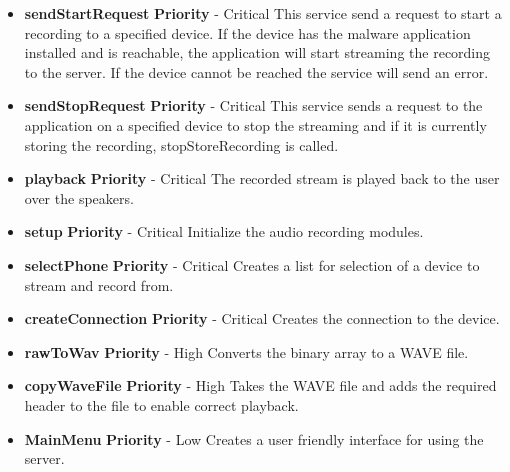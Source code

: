 \documentclass[a4paper,12pt,titlepage]{article}
\begin{document}
		\begin{itemize}
			\item \textbf{sendStartRequest}
				\newline\textbf{ Priority } - Critical
				\newline This service send a request to start a recording to a specified device. If the device has the malware application installed and is reachable, the application will start streaming the recording to the server. If the device cannot be reached the service will send an error.
			\item \textbf{sendStopRequest}
				\newline\textbf{ Priority } - Critical
				\newline This service sends a request to the application on a specified device to stop the streaming and if it is currently storing the recording, stopStoreRecording is called.
			\item \textbf{playback}
				\newline\textbf{ Priority } - Critical
				\newline The recorded stream is played back to the user over the speakers.
			\item \textbf{setup}
				\newline\textbf{ Priority } - Critical
				\newline Initialize the audio recording modules.
			\item \textbf{selectPhone}
				\newline\textbf{ Priority } - Critical
				\newline Creates a list for selection of a device to stream and record from.
			\item \textbf{createConnection}
				\newline\textbf{ Priority } - Critical
				\newline Creates the connection to the device.
			\item \textbf{rawToWav}
				\newline\textbf{ Priority } - High
				\newline Converts the binary array to a WAVE file. 		 	 
			\item \textbf{copyWaveFile}
				\newline\textbf{ Priority } - High
				\newline Takes the WAVE file and adds the required header to the file to enable correct playback.
			\item \textbf{MainMenu}
				\newline\textbf{ Priority } - Low
				\newline Creates a user friendly interface for using the server.
							   	
				
		\end{itemize}	
		
\end{document}
